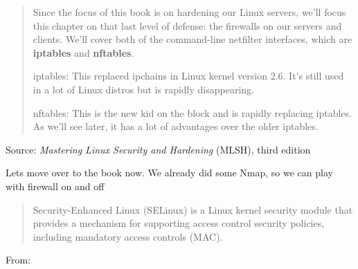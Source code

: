 \documentclass[Screen16to9,17pt]{foils}
\begin{document}

\begin{quote}
Since the focus of this book is on hardening our Linux servers, we’ll focus this chapter on that last
level of defense: the firewalls on our servers and clients. We’ll cover both of the command-line netfilter
interfaces, which are {\bf iptables} and {\bf nftables}.

\begin{list2}
\item iptables: This replaced ipchains in Linux kernel version 2.6. It’s still used in a lot of Linux
distros but is rapidly disappearing.
\item nftables: This is the new kid on the block and is rapidly replacing iptables. As we’ll see later,
it has a lot of advantages over the older iptables.
\end{list2}
\end{quote}
Source: \emph{Mastering Linux Security and Hardening} (MLSH), third edition


\begin{list2}
\item Lets move over to the book now. We already did some Nmap, so we can play with firewall on and off
\end{list2}




\begin{quote}
Security-Enhanced Linux (SELinux) is a Linux kernel security module that provides a mechanism for supporting access control security policies, including mandatory access controls (MAC).
\end{quote}
From:



\slidenext
\end{document}
